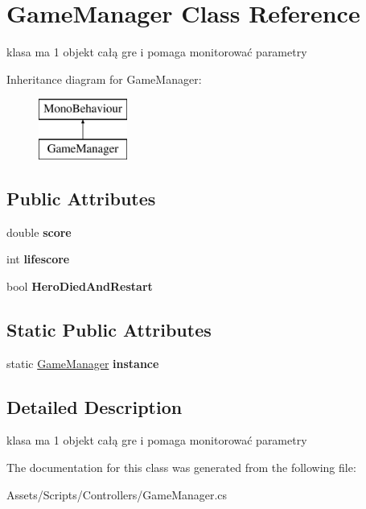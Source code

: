 \hypertarget{class_game_manager}{}\section{Game\+Manager Class Reference}
\label{class_game_manager}


klasa ma 1 objekt całą gre i pomaga monitorować parametry  


Inheritance diagram for Game\+Manager\+:\begin{figure}[H]
\begin{center}
\leavevmode
\includegraphics[height=2.000000cm]{class_game_manager}
\end{center}
\end{figure}
\subsection*{Public Attributes}
\begin{DoxyCompactItemize}
\item 
\mbox{\label{class_game_manager_a8bbc0d69f19654f6072316716fa477e7}} 
double {\bfseries score}
\item 
\mbox{\label{class_game_manager_ae9319015fb4e3a23a6d6fef6a7035964}} 
int {\bfseries lifescore}
\item 
\mbox{\label{class_game_manager_a96156b85918560fe198febbcfec701b9}} 
bool {\bfseries Hero\+Died\+And\+Restart}
\end{DoxyCompactItemize}
\subsection*{Static Public Attributes}
\begin{DoxyCompactItemize}
\item 
\mbox{\label{class_game_manager_a7666e8468dac197b9eb32dd32128524f}} 
static \hyperlink{class_game_manager}{Game\+Manager} {\bfseries instance}
\end{DoxyCompactItemize}


\subsection{Detailed Description}
klasa ma 1 objekt całą gre i pomaga monitorować parametry 



The documentation for this class was generated from the following file\+:\begin{DoxyCompactItemize}
\item 
Assets/\+Scripts/\+Controllers/Game\+Manager.\+cs\end{DoxyCompactItemize}
